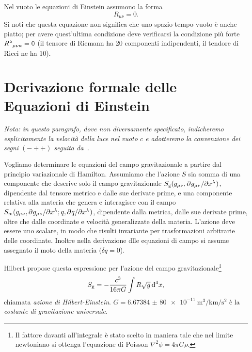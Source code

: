 Nel vuoto le equazioni di Einstein assumono la forma
\begin{equation}
  R_{\mu \nu}=0.
\end{equation}
Si noti che questa equazione non significa che uno spazio-tempo vuoto è anche
piatto; per avere quest'ultima condizione deve verificarsi la condizione più
forte $\tensor{R}{^{\lambda}_{\mu\nu\kappa}} = 0$ (il tensore di Riemann ha 20
componenti indipendenti, il tendore di Ricci ne ha 10).

\section{Derivazione formale delle Equazioni di Einstein}
\label{sec:equazioni-einstein}

\emph{Nota: in questo paragrafo, dove non diversamente specificato, indicheremo
  esplicitamente la velocità della luce nel vuoto $c$ e adotteremo la
  convenzione dei segni $(-++)$ seguita
  da~\textcites{barone:relativita,landau:campi}.}

Vogliamo determinare le equazioni del campo gravitazionale a partire dal
principio variazionale di Hamilton.  Assumiamo che l'azione $S$ sia somma di una
componente che descrive solo il campo gravitazionale $S_{\textup{g}}
(g_{\mu\nu}, \partial^{} g_{\mu\nu} / \partial {x^{\lambda}}^{})$, dipendente dal tensore metrico
e dalle sue derivate prime, e una componente relativa alla materia che genera e
interagisce con il campo $S_{\textup{m}} (g_{\mu\nu},
\partial^{} g_{\mu\nu} / \partial {x^{\lambda}}^{}; q, \partial^{} q / \partial {x^{\lambda}}^{})$, dipendente
dalla metrica, dalle sue derivate prime, oltre che dalle coordinate e velocità
generalizzate della materia.  L'azione deve essere uno scalare, in modo che
risulti invariante per trasformazioni arbitrarie delle coordinate.  Inoltre
nella derivazione dlle equazioni di campo si assume assegnato il moto della
materia ($\delta q=0$).

Hilbert propose questa espressione per l'azione del campo
gravitazionale\footnote{Il fattore davanti all'integrale è stato scelto in
  maniera tale che nel limite newtoniano si ottenga l'equazione di Poisson
  $\nabla^{2} \phi = 4\pi G\rho$.}
\begin{equation}
  S_{\textup{g}} = -\frac{c^{3}}{16\pi G} \int R \sqrt{g} \mathop{}\!\mathrm{d}^{4} x,
\end{equation}
chiamata  \emph{azione di Hilbert-Einstein}.
$G = \SI{6.673 84(80)e-11}{\cubic\metre\per\kilo\metre\per\second\squared}$ è la
\emph{costante di gravitazione universale}.

